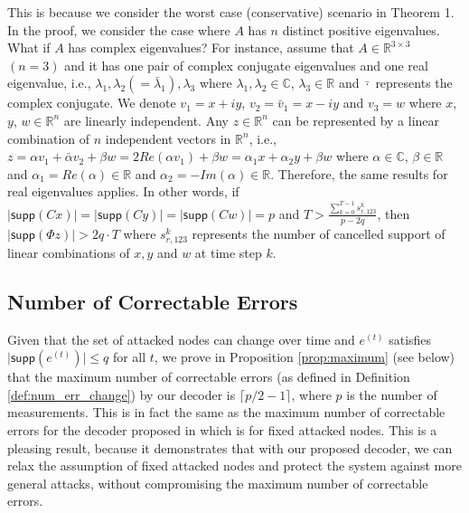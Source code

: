 \documentclass[journal]{IEEEtran}
\begin{document}
This is because we consider the worst case (conservative) scenario in Theorem 1. 
In the proof, we consider the case where $A$ has $n$ distinct positive eigenvalues. What if $A$ has complex eigenvalues? For instance, assume that $A \in \mathbb{R}^{3\times 3}$ $(n=3)$ and it has one pair of complex conjugate eigenvalues and one real eigenvalue, i.e., $\lambda_1, \lambda_2 (= \bar \lambda_1), \lambda_3$ where $\lambda_1, \lambda_2 \in \mathbb{C}$, $\lambda_3 \in \mathbb{R}$ and $\bar \cdot$ represents the complex conjugate. We denote $v_1 = x+ i y$, $v_2 = \bar v_1 = x - i y$ and $v_3 = w$ where $x$, $y$, $w  \in \mathbb{R}^n $ are linearly independent. Any $z \in \mathbb{R}^n$ can be represented by a linear combination of $n$ independent vectors in $\mathbb{R}^n$, i.e., $z = \alpha v_1 + \bar \alpha  v_2 + \beta w  = 2 Re( \alpha v_1) + \beta w =  \alpha_1 x + \alpha _2 y + \beta w$ where $\alpha \in \mathbb{C}$, $\beta \in \mathbb{R}$ and $\alpha_1 = Re(\alpha)\in \mathbb{R}$ and $\alpha_2 = - Im(\alpha) \in \mathbb{R}$. Therefore, the same results for real eigenvalues applies. In other words, if $ \lvert \textsf{supp}( C x) \rvert = \lvert \textsf{supp}( C y) \rvert = \lvert \textsf{supp}( C w) \rvert = p$ and $T > \frac { \sum_{k=0}^{T-1} s_{r,123}^k} {p - 2q}$, then $\lvert \textsf{supp} (\Phi z) \rvert > 2 q \cdot T$ where $s_{r,123}^k $ represents the number of cancelled support of linear combinations of $x,y$ and $w$ at time step $k$.



\subsection{Number of Correctable Errors}\label{sec:max_q}

Given that the set of attacked nodes can change over time and $e^{(t)}$ satisfies $\lvert \textsf{supp} (e^{(t)}) \rvert \le q$ for all $t$, we prove in Proposition \ref{prop:maximum} (see below) that the maximum number of correctable errors (as defined in Definition \ref{def:num_err_change}) by our decoder is $\lceil p/2-1 \rceil$, where $p$ is the number of measurements. This is in fact the same as the maximum number of correctable errors for the decoder proposed in \cite{Fawzi2014} which is for fixed attacked nodes.
This is a pleasing result, because it demonstrates that with our proposed decoder, we can relax the assumption of fixed attacked nodes and protect the system against more general attacks, without compromising the maximum number of correctable errors. 
\end{document}
